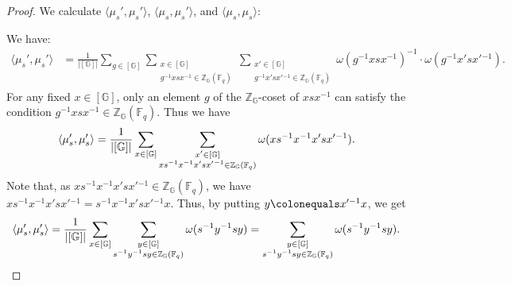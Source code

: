 \documentclass{amsart}
\newcommand{\F}{\mathbb{F}}
\newcommand{\FF}{\mathbb{F}}
\newcommand{\bbG}{\mathbb{G}}
\newcommand{\bbZ}{\mathbb{Z}}
\theoremstyle{plain}
\theoremstyle{definition}
\theoremstyle{remark}
\theoremstyle{theorem}
\begin{document}
\begin{proof}
    We calculate $\langle \mu_s', \mu_s' \rangle$, $\langle \mu_s, \mu_s' \rangle$, and $\langle \mu_s, \mu_s \rangle$:

    We have:
    \begin{align*}
        \langle \mu_s', \mu_s' \rangle
        &= \frac{1}{|[\bbG]|} \sum_{g \in [\bbG]} \sum_{\substack{x \in [\bbG] \\ g^{-1}xsx^{-1} \in \bbZ_{\bbG}(\FF_q)}} \sum_{\substack{x' \in [\bbG] \\ g^{-1} x'sx'{}^{-1} \in \bbZ_{\bbG}(\FF_q)}} \omega(g^{-1} xsx^{-1})^{-1} \cdot \omega(g^{-1} x'sx'{}^{-1}).
    \end{align*}
For any fixed $x\in[\bbG]$, only an element $g$ of the $\bbZ_{\bbG}$-coset of $xsx^{-1}$ can satisfy the condition $g^{-1}xsx^{-1} \in \bbZ_{\bbG}(\FF_q)$.
Thus we have
\[
\langle \mu_s', \mu_s' \rangle
=
\frac{1}{|[\bbG]|}
\sum_{x\in[\bbG]}
\sum_{\begin{subarray}{c}x'\in[\bbG] \\ xs^{-1}x^{-1}x'sx'{}^{-1}\in\bbZ_{\bbG}(\F_{q})\end{subarray}}
\omega(xs^{-1}x^{-1} x'sx'{}^{-1}).
\]
Note that, as $xs^{-1}x^{-1}x'sx'{}^{-1}\in\bbZ_{\bbG}(\F_{q})$, we have $xs^{-1}x^{-1} x'sx'{}^{-1}=s^{-1}x^{-1}x'sx'{}^{-1}x$.
Thus, by putting $y\colonequals x'^{-1}x$, we get
\begin{align}\label{eq:mu'mu'}
\langle \mu_s', \mu_s' \rangle
=
\frac{1}{|[\bbG]|}
\sum_{x\in[\bbG]}
\sum_{\begin{subarray}{c}y\in[\bbG] \\ s^{-1}y^{-1}sy\in\bbZ_{\bbG}(\F_{q})\end{subarray}}
\omega(s^{-1}y^{-1}sy)=
\sum_{\begin{subarray}{c}y\in[\bbG] \\ s^{-1}y^{-1}sy\in\bbZ_{\bbG}(\F_{q})\end{subarray}}
\omega(s^{-1}y^{-1}sy).
\end{align}


\end{proof}
\end{document}
